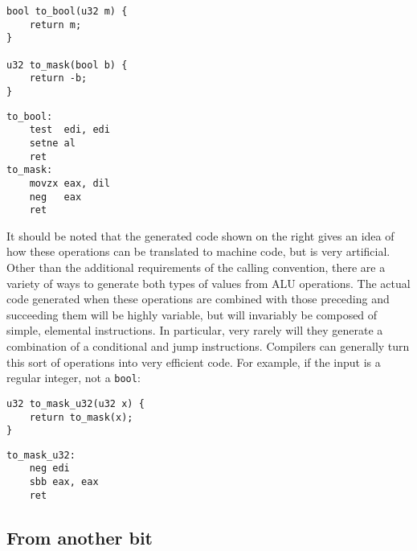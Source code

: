 
\begin{multicols}{2}
    \begin{lstlisting}[style=c]
bool to_bool(u32 m) {
    return m;
}

u32 to_mask(bool b) {
    return -b;
}
    \end{lstlisting}
    \columnbreak
    \begin{lstlisting}[style=x86]
to_bool:
    test  edi, edi
    setne al
    ret
to_mask:
    movzx eax, dil
    neg   eax
    ret
    \end{lstlisting}
\end{multicols}
\vspace{-\baselineskip}

It should be noted that the generated code shown on the right gives an idea of
how these operations can be translated to machine code, but is very artificial.
Other than the additional requirements of the calling convention, there are a
variety of ways to generate both types of values from ALU operations.  The
actual code generated when these operations are combined with those preceding
and succeeding them will be highly variable, but will invariably be composed of
simple, elemental instructions.  In particular, very rarely will they generate a
combination of a conditional and jump instructions.  Compilers can generally
turn this sort of operations into very efficient code.  For example, if the
input is a regular integer, not a \texttt{bool}:

\begin{multicols}{2}
    \begin{lstlisting}[style=c]
u32 to_mask_u32(u32 x) {
    return to_mask(x);
}
    \end{lstlisting}
    \columnbreak
    \begin{lstlisting}[style=x86]
to_mask_u32:
    neg edi
    sbb eax, eax
    ret
    \end{lstlisting}
\end{multicols}

\subsection{From another bit}

